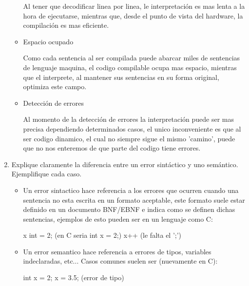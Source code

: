 \documentclass[a4paper,10pt]{article}
\begin{document}
\begin{enumerate}
\begin{itemize}
Al tener que decodificar linea por linea, le interpretación es mas lenta a la hora de ejecutarse, mientras que, desde el punto de vista del hardware, la compilación es mas eficiente.

\item Espacio ocupado

Como cada sentencia al ser compilada puede abarcar miles de sentencias de lenguaje maquina, el codigo compilable ocupa mas espacio, mientras que el interprete, al mantener sus sentencias en su forma original, optimiza este campo.

\item Detección de errores

Al momento de la detección de errores la interpretación puede ser mas precisa dependiendo determinados casos, el unico inconveniente es que al ser codigo dinamico, el cual no siempre sigue el mismo 'camino', puede que no nos enteremos de que parte del codigo tiene errores.

\end{itemize}

\item Explique claramente la diferencia entre un error sintáctico y uno semántico. Ejemplifique cada caso.

\begin{itemize}
\item Un error sintactico hace referencia a los errores que ocurren cuando una sentencia no esta escrita en un formato aceptable, este formato suele estar definido en un documento BNF/EBNF e indica como se definen dichas sentencias, ejemplos de esto pueden ser en un lenguaje como C:

\begin{center}

x int = 2;
\newline (en C seria int x = 2;)
\newline
\newline x++
\newline (le falta el ';')

\end{center}

\item Un error semantico hace referencia a errores de tipos, variables indeclaradas, etc... Casos comunes suelen ser (nuevamente en C):

\begin{center}

int x = 2;
\newline x = 3.5;
\newline (error de tipo)


\end{center}
\end{itemize}
\end{enumerate}
\end{document}
